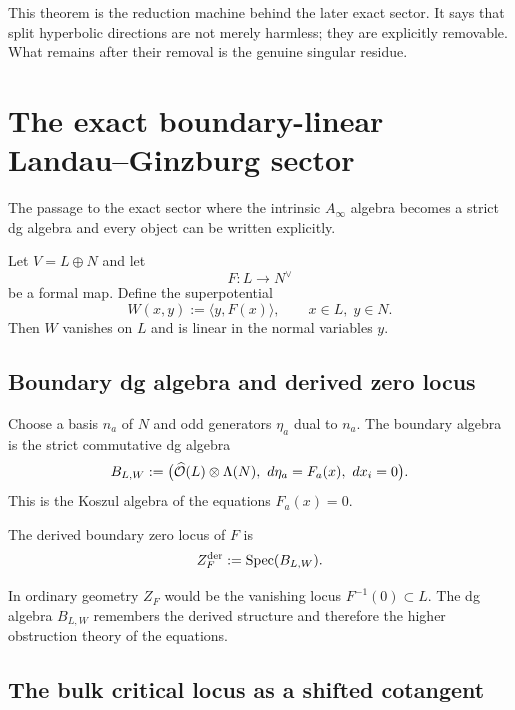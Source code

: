 \begin{remark}
This theorem is the reduction machine behind the later exact sector. It says that split hyperbolic directions are not merely harmless; they are explicitly removable. What remains after their removal is the genuine singular residue.
\end{remark}


\section{The exact boundary-linear Landau--Ginzburg sector}%

The passage to the exact sector where the intrinsic $A_\infty$ algebra becomes a strict dg algebra and every object can be written explicitly.

Let $V=L\oplus N$ and let
\[
F:L\longrightarrow N^\vee
\]
be a formal map. Define the superpotential
\[
W(x,y):=\langle y, F(x)\rangle,
\qquad
x\in L,\; y\in N.
\]
Then $W$ vanishes on $L$ and is linear in the normal variables $y$.

\subsection{Boundary dg algebra and derived zero locus}

Choose a basis $n_a$ of $N$ and odd generators $\eta_a$ dual to $n_a$. The boundary algebra is the strict commutative dg algebra
\begin{equation}%
B_{L,W}
:=
\bigl(\widehat{\cO}(L)\ot \Lambda(N),\ d\eta_a=F_a(x),\ dx_i=0\bigr).
\end{equation}
This is the Koszul algebra of the equations $F_a(x)=0$.

\begin{definition}
The derived boundary zero locus of $F$ is
\[
Z_F^{\mathrm{der}}:=\operatorname{Spec}(B_{L,W}).
\]
\end{definition}

\begin{remark}
In ordinary geometry $Z_F$ would be the vanishing locus $F^{-1}(0)\subset L$. The dg algebra $B_{L,W}$ remembers the derived structure and therefore the higher obstruction theory of the equations.
\end{remark}

\subsection{The bulk critical locus as a shifted cotangent}

